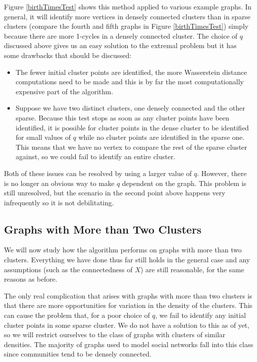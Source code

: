 \documentclass[12pt,a4paper]{amsart}
\numberwithin{equation}{section}
\theoremstyle{plain}
\theoremstyle{definition}
\begin{document}
\newpage

Figure \ref{birthTimesTest} shows this method applied to various example graphs. In general, it will identify more vertices in densely connected clusters than in sparse clusters (compare the fourth and fifth graphs in Figure \ref{birthTimesTest}) simply because there are more 1-cycles in a densely connected cluster. The choice of $q$ discussed above gives us an easy solution to the extremal problem but it has some drawbacks that should be discussed: 
\begin{itemize}
	\item The fewer initial cluster points are identified, the more Wasserstein distance computations need to be made and this is by far the most computationally expensive part of the algorithm.
	\item Suppose we have two distinct clusters, one densely connected and the other sparse. Because this test stops as soon as any cluster points have been identified, it is possible for cluster points in the dense cluster to be identified for small values of $q$ while no cluster points are identified in the sparse one. This means that we have no vertex to compare the rest of the sparse cluster against, so we could fail to identify an entire cluster.
\end{itemize}

Both of these issues can be resolved by using a larger value of $q$. However, there is no longer an obvious way to make $q$ dependent on the graph. This problem is still unresolved, but the scenario in the second point above happens very infrequently so it is not debilitating.

\subsection{Graphs with More than Two Clusters}

We will now study how the algorithm performs on graphs with more than two clusters. Everything we have done thus far still holds in the general case and any assumptions (such as the connectedness of $X$) are still reasonable, for the same reasons as before.

The only real complication that arises with graphs with more than two clusters is that there are more opportunities for variation in the density of the clusters. This can cause the problem that, for a poor choice of $q$, we fail to identify any initial cluster points in some sparse cluster. We do not have a solution to this as of yet, so we will restrict ourselves to the class of graphs with clusters of similar densities. The majority of graphs used to model social networks fall into this class since communities tend to be densely connected.
\end{document}
